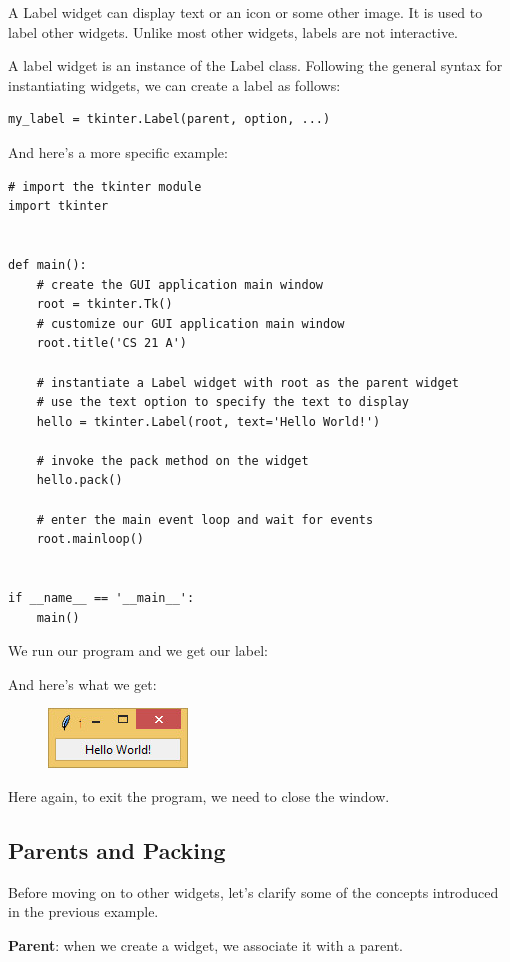 \documentclass{article}
\begin{document}
A Label widget can display text or an icon or some other image.  It is used to label other widgets. Unlike most other widgets, labels are not interactive.

A label widget is an instance of the Label class.  Following the general syntax for instantiating widgets, we can create a label as follows:

\begin{lstlisting}
my_label = tkinter.Label(parent, option, ...)
\end{lstlisting}

And here's a more specific example:

\begin{lstlisting}
# import the tkinter module
import tkinter


def main():
    # create the GUI application main window
    root = tkinter.Tk()
    # customize our GUI application main window
    root.title('CS 21 A')

    # instantiate a Label widget with root as the parent widget
    # use the text option to specify the text to display
    hello = tkinter.Label(root, text='Hello World!')

    # invoke the pack method on the widget
    hello.pack()

    # enter the main event loop and wait for events
    root.mainloop()


if __name__ == '__main__':
    main()
\end{lstlisting}

We run our program and we get our label:
 
And here's what we get:
\begin{figure}[h]
\includegraphics[scale=.6]{hellogui}\\
\end{figure}

Here again, to exit the program, we need to close the window.

\subsection{Parents and Packing}
Before moving on to other widgets, let's clarify some of the concepts introduced in the previous example.

\textbf{Parent}:  when we create a widget, we associate it with a parent.
\end{document}
